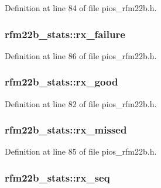 Definition at line 84 of file pios\-\_\-rfm22b.\-h.

\hypertarget{structrfm22b__stats_a4acb04b442511cd543677d8d8e7b4a81}{
\subsubsection[{rx\-\_\-failure}]{ rfm22b\-\_\-stats\-::rx\-\_\-failure}}\label{structrfm22b__stats_a4acb04b442511cd543677d8d8e7b4a81}


Definition at line 86 of file pios\-\_\-rfm22b.\-h.

\hypertarget{structrfm22b__stats_aa9b17c04f89e42496f776f7cac5b549d}{
\subsubsection[{rx\-\_\-good}]{ rfm22b\-\_\-stats\-::rx\-\_\-good}}\label{structrfm22b__stats_aa9b17c04f89e42496f776f7cac5b549d}


Definition at line 82 of file pios\-\_\-rfm22b.\-h.

\hypertarget{structrfm22b__stats_a10156bfde7480e15c39ba077da5f687f}{
\subsubsection[{rx\-\_\-missed}]{ rfm22b\-\_\-stats\-::rx\-\_\-missed}}\label{structrfm22b__stats_a10156bfde7480e15c39ba077da5f687f}


Definition at line 85 of file pios\-\_\-rfm22b.\-h.

\hypertarget{structrfm22b__stats_ad73defbcdc26cc6438d0f28723a909e7}{
\subsubsection[{rx\-\_\-seq}]{ rfm22b\-\_\-stats\-::rx\-\_\-seq}}\label{structrfm22b__stats_ad73defbcdc26cc6438d0f28723a909e7}


